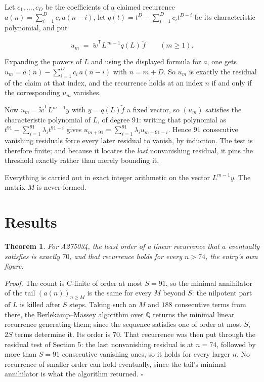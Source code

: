 \documentclass[11pt]{article}
\newtheorem{theorem}{Theorem}
\theoremstyle{definition}
\begin{document}
Let $c_1,\dots,c_D$ be the coefficients of a claimed recurrence $a(n) = \sum_{i=1}^{D} c_i\,a(n-i)$, let $q(t) = t^{D} - \sum_{i=1}^{D} c_i t^{D-i}$ be its characteristic polynomial, and put

\[u_m \;=\; \tilde w^{\mathsf T} L^{\,m-1} q(L)\,\tilde f \qquad (m \ge 1).\]

Expanding the powers of $L$ and using the displayed formula for $a$, one gets $u_m = a(n) - \sum_{i=1}^{D} c_i\,a(n-i)$ with $n = m + D$. So $u_m$ is exactly the residual of the claim at that index, and the recurrence holds at an index $n$ if and only if the corresponding $u_m$ vanishes.

Now $u_m = \tilde w^{\mathsf T} L^{m-1} y$ with $y = q(L)\tilde f$ a fixed vector, so $(u_m)$ satisfies the characteristic polynomial of $L$, of degree $91$: writing that polynomial as $t^{91} - \sum_{i=1}^{91} \lambda_i t^{91-i}$ gives $u_{m+91} = \sum_{i=1}^{91} \lambda_i u_{m+91-i}$. Hence $91$ consecutive vanishing residuals force every later residual to vanish, by induction. The test is therefore finite; and because it locates the {\itshape last} nonvanishing residual, it pins the threshold exactly rather than merely bounding it.

Everything is carried out in exact integer arithmetic on the vector $L^{m-1}y$. The matrix $M$ is never formed.

\section{Results}

\begin{theorem} For A275034, the least order of a linear recurrence that $a$ eventually satisfies is exactly $70$, and that recurrence holds for every $n > 74$, the entry's own figure.\end{theorem}

{\itshape Proof.} The count is C-finite of order at most $S = 91$, so the minimal annihilator of the tail $(a(n))_{n \ge M}$ is the same for every $M$ beyond $S$: the nilpotent part of $L$ is killed after $S$ steps. Taking such an $M$ and $188$ consecutive terms from there, the Berlekamp--Massey algorithm over $\mathbb{Q}$ returns the minimal linear recurrence generating them; since the sequence satisfies one of order at most $S$, $2S$ terms determine it. Its order is $70$. That recurrence was then put through the residual test of Section 5: the last nonvanishing residual is at $n = 74$, followed by more than $S = 91$ consecutive vanishing ones, so it holds for every larger $n$. No recurrence of smaller order can hold eventually, since the tail's minimal annihilator is what the algorithm returned. $\square$
\end{document}
